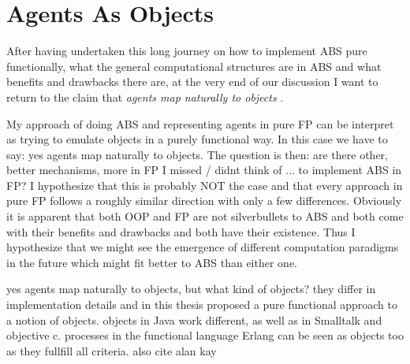 \chapter{Agents As Objects}
After having undertaken this long journey on how to implement ABS pure functionally, what the general computational structures are in ABS and what benefits and drawbacks there are, at the very end of our discussion I want to return to the claim that \textit{agents map naturally to objects} \cite{north_managing_2007}.

My approach of doing ABS and representing agents in pure FP can be interpret as trying to emulate objects in a purely functional way. In this case we have to say: yes agents map naturally to objects. The question is then: are there other, better mechanisms, more in FP I missed / didnt think of ... to implement ABS in FP? I hypothesize that this is probably NOT the case and that every approach in pure FP follows a roughly similar direction with only a few differences. Obviously it is apparent that both OOP and FP are not silverbullets to ABS and both come with their benefits and drawbacks and both have their existence. Thus I hypothesize that we might see the emergence of different computation paradigms in the future which might fit better to ABS than either one.

yes agents map naturally to objects, but what kind of objects? they differ in implementation details and in this thesis proposed a pure functional approach to a notion of objects. objects in Java work different, as well as in Smalltalk and objective c. processes in the functional language Erlang can be seen as objects too as they fullfill all criteria. also cite alan kay